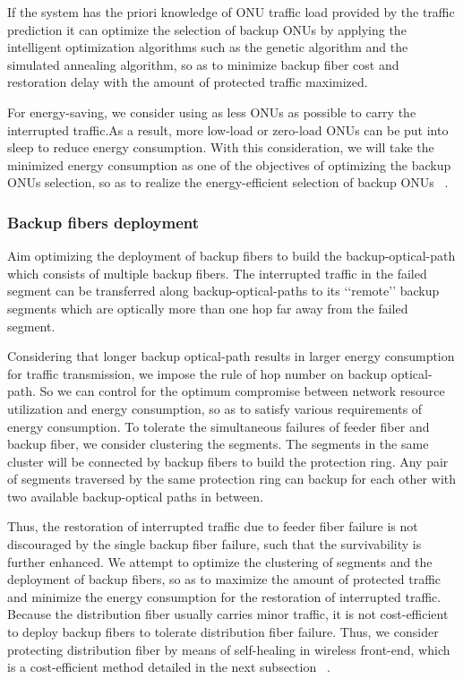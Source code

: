 \documentclass[conference,compsoc]{IEEEtran}
\begin{document}
If the system has  the priori knowledge of ONU traffic load provided by the traffic 
prediction it can  optimize the selection of backup ONUs by applying the intelligent optimization 
algorithms such as the genetic algorithm and the simulated annealing algorithm, so as to minimize 
backup fiber cost and restoration delay with the amount of protected traffic maximized. 

For energy-saving, we consider using as less ONUs as possible to carry the interrupted traffic.As a 
result, more low-load or zero-load ONUs can be put into sleep to reduce energy consumption. With 
this consideration, we will take the minimized energy consumption as one of the objectives of 
optimizing the backup ONUs selection, so as to realize the energy-efficient selection of backup ONUs 
~\cite{Liu201268}.



\subsubsection{Backup fibers deployment}
  Aim  optimizing the deployment of backup fibers to build the backup-optical-path which consists 
of multiple backup fibers. The interrupted traffic in the failed segment can be transferred along 
backup-optical-paths to its ‘‘remote’’ backup segments which are optically more than one hop far 
away from the failed segment.  

Considering that longer backup optical-path results in larger energy 
consumption for traffic transmission, we impose the rule of hop number on backup optical-path. So we 
can control for the optimum compromise between network resource utilization and energy consumption, 
so as to satisfy various requirements of energy consumption. To tolerate the simultaneous failures 
of feeder fiber and backup fiber, we consider clustering the segments. The segments in the same 
cluster will be connected by backup fibers to build the protection ring. Any pair of segments 
traversed by the same protection ring can backup for each other with two available backup-optical 
paths in between. 

Thus, the restoration of interrupted traffic due to feeder fiber failure is not 
discouraged by the single backup fiber failure, such that the survivability is further enhanced. We 
attempt to optimize the clustering of segments and the deployment of backup fibers, so as to 
maximize the amount of  protected traffic and minimize the energy consumption for the restoration of 
interrupted traffic. Because the distribution fiber usually carries minor traffic, it is not 
cost-efficient to deploy backup fibers to tolerate distribution fiber failure. Thus, we consider 
protecting distribution fiber by means of self-healing in wireless front-end, which is a 
cost-efficient method detailed in 
the next subsection ~\cite{Liu201268}.
\end{document}
